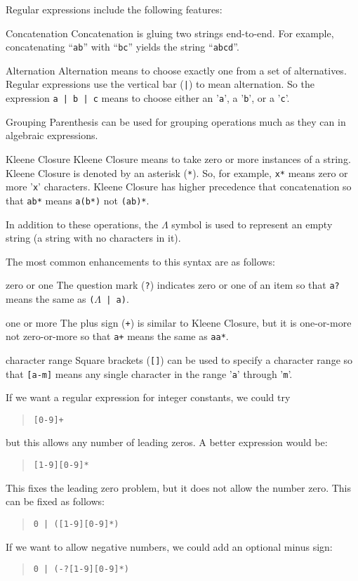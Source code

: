 \documentclass[letterpaper,12pt,openany,reqno]{book}%
\newenvironment{mydesc}[1][9em]
  {
     \begin{basedescript}
     {
      \renewcommand{\makelabel}[1]{\bfseries##1}
      \desclabelwidth{ #1 }
      \desclabelstyle{\multilinelabel}
     }
  }
  {
     \end{basedescript}%
  }
\begin{document}
Regular expressions include the following features:
\begin{mydesc}[10em]
	\item[Concatenation] Concatenation is gluing two strings end-to-end. For example, concatenating ``\texttt{ab}'' with ``\texttt{bc}'' yields the string ``\texttt{abcd}''.
  \item[Alternation] Alternation means to choose exactly one from a set of alternatives. Regular expressions use the vertical bar (\texttt{|}) to mean alternation. So the expression \texttt{a | b | c} means to choose either an '\texttt{a}', a '\texttt{b}', or a '\texttt{c}'.
	\item[Grouping] Parenthesis can be used for grouping operations much as they can in algebraic expressions.
	\item[Kleene Closure] Kleene Closure means to take zero or more instances of a string. Kleene Closure is denoted by an asterisk (\texttt{*}). So, for example, \texttt{x*} means zero or more '\texttt{x}' characters. Kleene Closure has higher precedence that concatenation so that \texttt{ab*} means \texttt{a(b*)} not \texttt{(ab)*}.
\end{mydesc}

In addition to these operations, the $\Lambda$ symbol is used to represent an empty string (a string with no characters in it).

The most common enhancements to this syntax are as follows:
\begin{mydesc}
\item[zero or one] The question mark (\texttt{?}) indicates zero or one of an item so that \texttt{a?} means the same as \texttt{($\Lambda$ | a)}.
\item[one or more] The plus sign (\texttt{+}) is similar to Kleene Closure, but it is one-or-more not zero-or-more so that \texttt{a+} means the same as \texttt{aa*}.
\item[character range] Square brackets (\texttt{[]}) can be used to specify a character range so that \texttt{[a-m]} means any single character in the range '\texttt{a}' through '\texttt{m}'.
\end{mydesc}

If we want a regular expression for integer constants, we could try
\begin{quote}\texttt{[0-9]+}\end{quote}
but this allows any number of leading zeros. A better expression would be:
\begin{quote}\texttt{[1-9][0-9]*}\end{quote}
This fixes the leading zero problem, but it does not allow the number zero. This can be fixed as follows:
\begin{quote}\texttt{0 | ([1-9][0-9]*)}\end{quote}
If we want to allow negative numbers, we could add an optional minus sign:
\begin{quote}\texttt{0 | (-?[1-9][0-9]*)}\end{quote}
\end{document}
